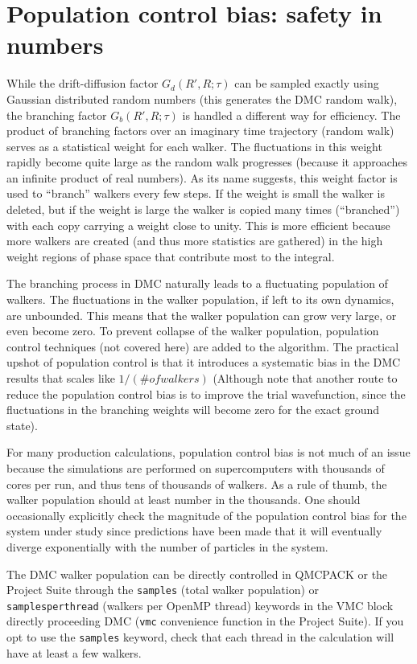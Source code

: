 \documentclass[oneside,11pt]{memoir}
\numberwithin{equation}{section}
\begin{document}
\section{Population control bias: safety in numbers}
While the drift-diffusion factor $G_d(R',R;\tau)$ can be sampled exactly using 
Gaussian distributed random numbers (this generates the DMC random walk), the 
branching factor $G_b(R',R;\tau)$ is handled a different way for efficiency.  
The product of branching factors over an imaginary time trajectory (random 
walk) serves as a statistical weight for each walker.  The fluctuations in 
this weight rapidly become quite large as the random walk progresses 
(because it approaches an infinite product of real numbers).  As its name 
suggests, this weight factor is used to ``branch'' walkers every few steps.  
If the weight is small the walker is deleted, but if the weight is large the 
walker is copied many times (``branched'') with each copy carrying a weight 
close to unity.  This is more efficient because more walkers are created (and 
thus more statistics are gathered) in the high weight regions of phase space 
that contribute most to the integral.

The branching process in DMC naturally leads to a fluctuating population of 
walkers.  The fluctuations in the walker population, if left to its own 
dynamics, are unbounded.  This means that the walker population can grow very 
large, or even become zero.  To prevent collapse of the walker population, 
population control techniques (not covered here) are added to the algorithm.
The practical upshot of population control is that it introduces a systematic 
bias in the DMC results that scales like $1/(\# of walkers)$ (Although note 
that another route to reduce the population control bias is to improve the 
trial wavefunction, since the fluctuations in the branching weights will 
become zero for the exact ground state).  

For many production calculations, population control bias is not much of an 
issue because the simulations are performed on supercomputers with thousands of 
cores per run, and thus tens of thousands of walkers.  As a rule of thumb, the 
walker population should at least number in the thousands.  One should 
occasionally explicitly check the magnitude of the population control bias for 
the system under study since predictions have been made that it will 
eventually diverge exponentially with the number of particles in the system.

The DMC walker population can be directly controlled in QMCPACK or the Project 
Suite through the \texttt{samples} (total walker population) or 
\texttt{samplesperthread} (walkers per OpenMP thread) keywords in the VMC 
block directly proceeding DMC (\texttt{vmc} convenience function in the 
Project Suite).  If you opt to use the \texttt{samples} keyword, check that 
each thread in the calculation will have at least a few walkers.
\end{document}
